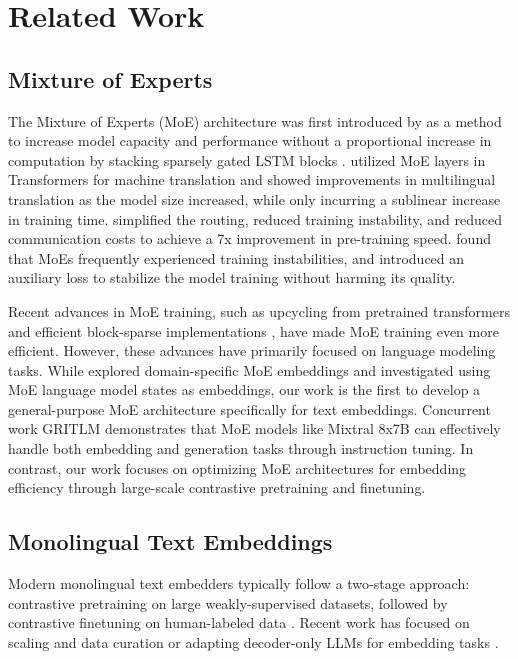 \section{Related Work}
\subsection{Mixture of Experts}
The Mixture of Experts (MoE) architecture was first introduced by \citet{shazeer2017outrageouslylargeneuralnetworks} as a method to increase model capacity and performance without a proportional increase in computation by stacking sparsely gated LSTM blocks \citep{hochreiter1997lstm}.
\citet{lepikhin2020gshardscalinggiantmodels} utilized MoE layers in Transformers for machine translation and showed improvements in multilingual translation as the model size increased, while only incurring a sublinear increase in training time.
\citet{fedus2022switchtransformersscalingtrillion} simplified the routing, reduced training instability, and reduced communication costs to achieve a 7x improvement in pre-training speed.
\citet{zoph2022stmoedesigningstabletransferable} found that MoEs frequently experienced training instabilities, and introduced an auxiliary loss to stabilize the model training without harming its quality. 


Recent advances in MoE training, such as upcycling from pretrained transformers \citep{komatsuzaki2023sparseupcyclingtrainingmixtureofexperts} and efficient block-sparse implementations \citep{gale2022megablocksefficientsparsetraining}, have made MoE training even more efficient. However, these advances have primarily focused on language modeling tasks. While \citet{hallee2024contrastivelearningmixtureexperts} explored domain-specific MoE embeddings and \citet{li2024mixtureofexpertsllmsecretlyembedding} investigated using MoE language model states as embeddings, our work is the first to develop a general-purpose MoE architecture specifically for text embeddings. Concurrent work GRITLM \citep{muennighoff2024generativerepresentationalinstructiontuning} demonstrates that MoE models like Mixtral 8x7B can effectively handle both embedding and generation tasks through instruction tuning. In contrast, our work focuses on optimizing MoE architectures for embedding efficiency through large-scale contrastive pretraining and finetuning.


\subsection{Monolingual Text Embeddings}
Modern monolingual text embedders typically follow a two-stage approach: contrastive pretraining on large weakly-supervised datasets, followed by contrastive finetuning on human-labeled data \citep{wang2022text,li2023general,günther2023jina,nussbaum2024nomicembedtrainingreproducible}.
Recent work has focused on scaling and data curation \citep{xiao2023cpack,wang2022text,li2023general,günther2023jina,nussbaum2024nomicembedtrainingreproducible,merrick2024arcticembedscalableefficientaccurate,yu2024arcticembed20multilingualretrieval} or adapting decoder-only LLMs for embedding tasks \citep{wang2023improving, lee2024nvembedimprovedtechniquestraining}.



